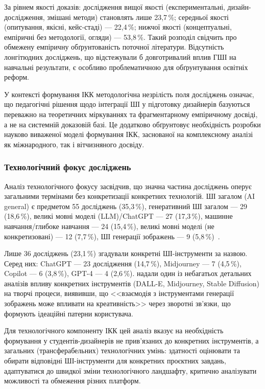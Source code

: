 За рівнем якості доказів: дослідження вищої якості (експериментальні, дизайн-дослідження, змішані методи) становлять лише 23,7\,\%; середньої якості (опитування, якісні, кейс-стаді) --- 22,4\,\%; нижчої якості (концептуальні, емпіричні без методології, огляди) --- 53,8\,\%. Такий розподіл свідчить про обмежену емпіричну обґрунтованість поточної літератури. Відсутність лонгітюдних досліджень, що відстежували б довготривалий вплив ГШІ на навчальні результати, є особливо проблематичною для обґрунтування освітніх реформ.

У контексті формування ІКК методологічна незрілість поля досліджень означає, що педагогічні рішення щодо інтеграції ШІ у підготовку дизайнерів базуються переважно на теоретичних міркуваннях та фрагментарному емпіричному досвіді, а не на системній доказовій базі. Це додатково обґрунтовує необхідність розробки науково виваженої моделі формування ІКК, заснованої на комплексному аналізі як міжнародного, так і вітчизняного досвіду.

\subsubsection{Технологічний фокус досліджень}\label{sssec:1.2.5}

Аналіз технологічного фокусу засвідчив, що значна частина досліджень оперує загальними термінами без конкретизації конкретних технологій. ШІ загалом (AI general) є предметом 55 досліджень (35,3\,\%), генеративний ШІ загалом --- 29 (18,6\,\%), великі мовні моделі (LLM)/ChatGPT --- 27 (17,3\,\%), машинне навчання/глибоке навчання --- 24 (15,4\,\%), великі мовні моделі (не конкретизовані) --- 12 (7,7\,\%), ШІ генерації зображень --- 9 (5,8\,\%)~\cite{Musiienko2026ScopingReview}.

Лише 36 досліджень (23,1\,\%) згадували конкретні ШІ-інструменти за назвою. Серед них: ChatGPT --- 23 дослідження (14,7\,\%), Midjourney --- 7 (4,5\,\%), Copilot --- 6 (3,8\,\%), GPT-4 --- 4 (2,6\,\%). \citet{Turchi2023} надали один із небагатьох детальних аналізів впливу конкретних інструментів (DALL-E, Midjourney, Stable Diffusion) на творчі процеси, виявивши, що <<взаємодія з інструментами генерації зображень може впливати на креативність>> через зворотні зв'язки, що формують ідеаційні патерни користувача.

Для технологічного компоненту ІКК цей аналіз вказує на необхідність формування у студентів-дизайнерів не прив'язаних до конкретних інструментів, а загальних (трансферабельних) технологічних умінь: здатності оцінювати та обирати відповідні ШІ-інструменти для конкретних проєктних завдань, адаптуватися до швидкої зміни технологічного ландшафту, критично аналізувати можливості та обмеження різних платформ.

